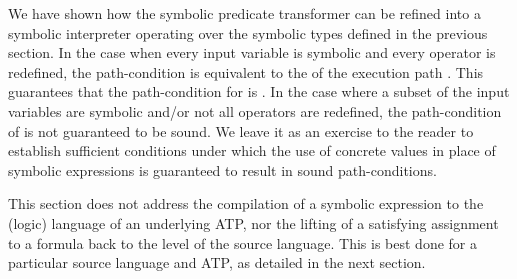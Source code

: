 \documentclass{IOS-Book-Article}
\begin{document}
\begin{mdP}[data-line={584}]%
{}We have shown how the symbolic predicate transformer %
{}%
{} can 
be refined into a symbolic interpreter operating over the
symbolic types defined in the previous section.
In the case when every input variable is symbolic and every
operator is redefined, the path-condition is equivalent to the
{}%
{} of the execution path %
{}%
{}. 
This guarantees that the path-condition for %
{}%
{} is %
{}%
{}.
In the case where a subset of the input variables are symbolic
and/or not all operators are redefined, the path-condition of %
{}%
{} 
is not guaranteed to be sound. We leave it as an exercise to the
reader to establish sufficient conditions under which the 
use of concrete values in place of symbolic expressions is 
guaranteed to result in sound path-conditions.%
\end{mdP}%
\begin{mdP}[class={indent},data-line={598}]%
{}This section does not address the compilation of a symbolic
expression to the (logic) language of an underlying ATP, nor the
lifting of a satisfying assignment to a formula back to the
level of the source language. This is best done for a particular
source language and ATP, as detailed in the next section.%
\end{mdP}%
\end{document}
